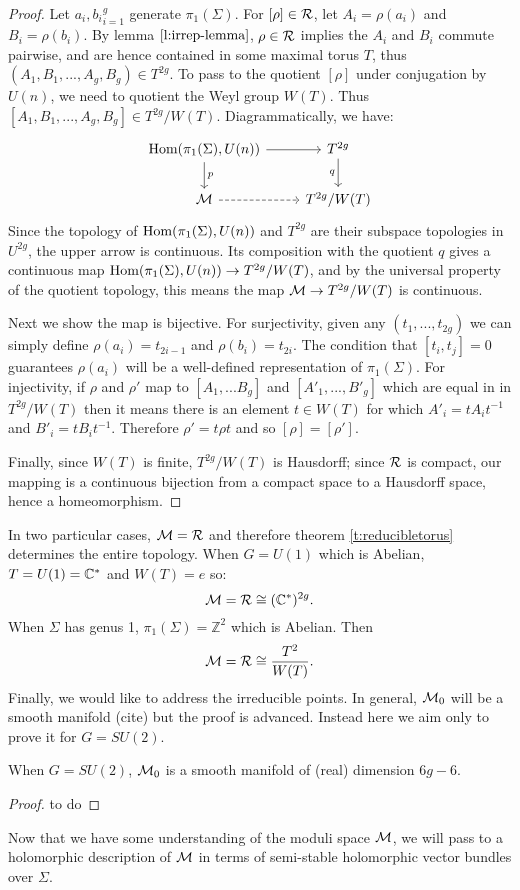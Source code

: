 	\begin{proof}
		Let ${a_i,b_i}_{i=1}^{g}$ generate $\pi_1(\Sigma)$. For $[\rho]\in \mathcal{R}$, let $A_i = \rho(a_i)$ and $B_i = \rho(b_i)$. By lemma $\ref{l:irrep-lemma}$, $\rho\in \mathcal{R}$ implies the $A_i$ and $B_i$ commute pairwise, and are hence contained in some maximal torus $T$, thus $(A_1,B_1,...,A_g,B_g)\in T^{2g}$. To pass to the quotient $[\rho]$ under conjugation by $U(n)$, we need to quotient the Weyl group $W(T)$. Thus $[A_1,B_1,...,A_g,B_g] \in T^{2g}/W(T)$. Diagrammatically, we have:
		\[\begin{tikzcd}
		{\Hom(\pi_1(\Sigma),U(n))} & {T^{2g}} \\
		\MM & {T^{2g}/W(T)}
		\arrow["p", from=1-1, to=2-1]
		\arrow[from=1-1, to=1-2]
		\arrow["q"', from=1-2, to=2-2]
		\arrow[dashed, from=2-1, to=2-2]
		\end{tikzcd}\]
		Since the topology of $\text{Hom}(\pi_1(\Sigma),U(n))$ and $T^{2g}$ are their subspace topologies in $U^{2g}$, the upper arrow is continuous. Its composition with the quotient $q$ gives a continuous map $\text{Hom}(\pi_1(\Sigma), U(n))\to T^{2g}/W(T)$, and by the universal property of the quotient topology, this means the map $\mathcal{M}\to T^{2g}/W(T)$ is continuous.
		
		Next we show the map is bijective. For surjectivity, given any $(t_1,...,t_{2g})$ we can simply define $\rho(a_i) = t_{2i-1}$ and $\rho(b_i) = t_{2i}$. The condition that $[t_i,t_j]=0$ guarantees $\rho(a_i)$ will be a well-defined representation of $\pi_1(\Sigma)$. For injectivity, if $\rho$ and $\rho'$ map to $[A_1,...B_g]$ and $[A'_1,...,B'_g]$ which are equal in in $T^{2g}/W(T)$ then it means there is an element $t\in W(T)$ for which $A'_i = tA_it^{-1}$ and $B'_i = tB_i t^{-1}$. Therefore $\rho' = t\rho t$ and so $[\rho]=[\rho']$.
		
		Finally, since $W(T)$ is finite, $T^{2g}/W(T)$ is Hausdorff; since $\mathcal{R}$ is compact, our mapping is a continuous bijection from a compact space to a Hausdorff space, hence a homeomorphism.
	\end{proof}
	In two particular cases, $\mathcal{M} = \mathcal{R}$ and therefore theorem \ref{t:reducibletorus} determines the entire topology. When $G=U(1)$ which is Abelian, $T = U(1) = \mathbb{C}^{\ast}$ and $W(T) = {e}$ so:
	\begin{equation}
		\mathcal{M} = \mathcal{R} \cong (\mathbb{C}^{\ast})^{2g}.
	\end{equation}
	When $\Sigma$ has genus 1, $\pi_1(\Sigma) = \mathbb{Z}^2$ which is Abelian. Then
	\begin{equation}
		\mathcal{M} = \mathcal{R} \cong \frac{T^{2}}{W(T)}.
	\end{equation}
	Finally, we would like to address the irreducible points. In general, $\mathcal{M}_0$ will be a smooth manifold (cite) but the proof is advanced. Instead here we aim only to prove it for $G=SU(2)$. 
	\begin{theorem}
		When $G=SU(2)$, $\mathcal{M}_0$ is a smooth manifold of (real) dimension $6g-6$.
	\end{theorem}
	\begin{proof}
		to do
	\end{proof}
	Now that we have some understanding of the moduli space $\mathcal{M}$, we will pass to a holomorphic description of $\mathcal{M}$ in terms of semi-stable holomorphic vector bundles over $\Sigma$.
